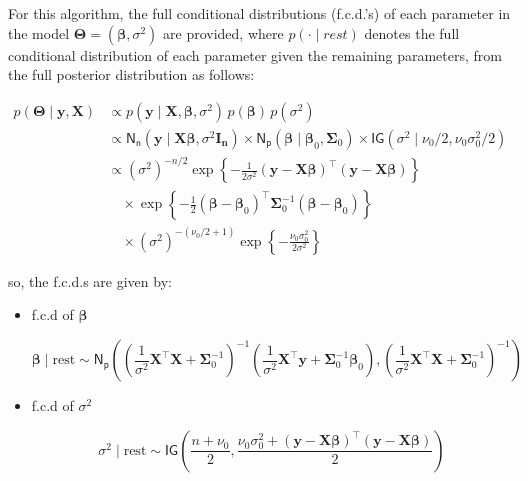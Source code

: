 For this algorithm, the full conditional distributions (f.c.d.'s) of each parameter in the model $\bm{\Theta} = (\bm{\beta}, \sigma^2)$ are provided, where $p(\cdot \mid \textit{rest})$ denotes the full conditional distribution of each parameter given the remaining parameters, from the full posterior distribution as follows:

\begin{equation}
    \label{POST_LRM}
    \begin{split}
    p(\bm{\Theta} \mid \bm{y}, \bm{X}) 
    &\propto 
p(\bm{y} \mid \bm{X}, \bm{\beta}, \sigma^2) \,
p(\bm{\beta} ) \,
p(\sigma^2 )\\
&\propto\mathsf{N_n}\left(\bm{y}\mid\bm{X}\bm{\beta},\sigma^2\bm{I_n}\right)\times\mathsf{N_p}(\bm{\beta}\mid\bm{\beta}_0, \bm{\Sigma}_0)\times\mathsf{IG}\left(\sigma^2\mid\nu_0/ 2, \nu_0 \sigma_0^2 / 2\right)\\
&\propto (\sigma^2)^{-n/2} 
\exp\left\{ -\frac{1}{2\sigma^2}  (\bm{y} - \bm{X} \bm{\beta})^{\top}
(\bm{y} - \bm{X} \bm{\beta}) \right\} \\
&\quad \times \exp\left\{ -\frac{1}{2} (\bm{\beta} - \bm{\beta}_0)^{\top}
\bm{\Sigma}_0^{-1} (\bm{\beta} - \bm{\beta}_0) \right\} \\
&\quad \times (\sigma^2)^{-(\nu_0/2 + 1)} 
\exp\left\{ -\frac{\nu_0 \sigma_0^2}{2\sigma^2} \right\}
\end{split}
\end{equation}

so, the f.c.d.s are given by:

\begin{itemize}

\item f.c.d of $\bm{\beta}$

\begin{equation}
    \label{LRM_MCMC_Beta}
    \bm{\beta} \mid \text{rest} \sim \mathsf{N_p}\left(\left( \frac{1}{\sigma^2} \bm{X}^\top \bm{X} + \bm{\Sigma}_0^{-1} \right)^{-1}\left( \frac{1}{\sigma^2} \bm{X}^\top \bm{y} + \bm{\Sigma}_0^{-1} \bm{\beta}_0 \right), \left( \frac{1}{\sigma^2} \bm{X}^\top \bm{X} + \bm{\Sigma}_0^{-1} \right)^{-1}\right)
\end{equation}

\item  f.c.d of $\sigma^2$

\begin{equation}
    \label{LRM_MCMC_sigma2}
    \sigma^2 \mid \text{rest} \sim \mathsf{IG}\left( \frac{n + \nu_0}{2}, \frac{\nu_0 \sigma_0^2 + (\bm{y} - \bm{X} \bm{\beta})^\top (\bm{y} - \bm{X} \bm{\beta})}{2} \right)
\end{equation}

\end{itemize}

